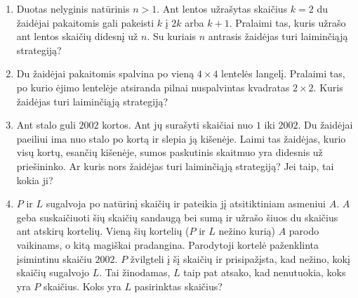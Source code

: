 \begin{enumerate}
  \item Duotas nelyginis natūrinis $n>1$. Ant lentos užrašytas skaičius $k=2$ du
    žaidėjai pakaitomis gali pakeisti $k$ į $2k$ arba $k+1$. Pralaimi tas, kuris
    užrašo ant lentos skaičių didesnį už $n$. Su kuriais $n$ antrasis žaidėjas
    turi laiminčiąją strategiją? 

  \item  Du žaidėjai pakaitomis spalvina po vieną  $4\times 4$ lentelės langelį.
    Pralaimi tas, po kurio ėjimo lentelėje atsiranda pilnai nuspalvintas
    kvadratas  $2\times 2$. Kuris žaidėjas turi laiminčiąją strategiją?

  \item Ant stalo guli $2002$ kortos. Ant jų surašyti skaičiai nuo $1$ iki $2002$. Du
    žaidėjai paeiliui ima nuo stalo po kortą ir slepia ją kišenėje. Laimi tas
    žaidėjas, kurio visų kortų, esančių kišenėje, sumos paskutinis skaitmuo yra
    didesnis už priešininko. Ar kuris nors žaidėjas turi laiminčiąją strategiją?
    Jei taip, tai kokia ji? 

  \item $P$ ir $L$ sugalvoja po natūrinį skaičių ir pateikia jį atsitiktiniam
    asmeniui $A$. $A$ geba suskaičiuoti šių skaičių sandaugą bei sumą ir užrašo šiuos
    du skaičius ant atskirų kortelių. Vieną šių kortelių ($P$ ir $L$ nežino kurią) $A$
    parodo vaikinams, o kitą magiškai pradangina. Parodytoji kortelė paženklinta
    įsimintinu skaičiu $2002$. $P$ žvilgteli į šį skaičių ir prisipažįsta, kad
    nežino, kokį skaičių sugalvojo $L$. Tai žinodamas, $L$ taip pat atsako, kad
    nenutuokia, koks yra $P$ skaičius. Koks yra $L$ pasirinktas skaičius? 


\end{enumerate}
